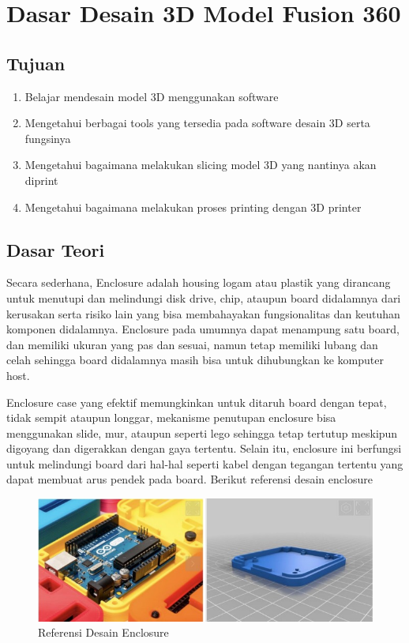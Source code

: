 \chapter{Dasar Desain 3D Model Fusion 360}

\section{Tujuan}
\begin{enumerate}
    \item Belajar mendesain model 3D menggunakan software
    \item Mengetahui berbagai tools yang tersedia pada software desain 3D serta fungsinya
    \item Mengetahui bagaimana melakukan slicing model 3D yang nantinya akan diprint
    \item Mengetahui bagaimana melakukan proses printing dengan 3D printer
\end{enumerate}

\section{Dasar Teori}
Secara sederhana, Enclosure adalah housing logam atau plastik yang dirancang untuk menutupi dan
melindungi disk drive, chip, ataupun board didalamnya dari kerusakan serta risiko lain yang bisa
membahayakan fungsionalitas dan keutuhan komponen didalamnya. Enclosure pada umumnya dapat
menampung satu board, dan memiliki ukuran yang pas dan sesuai, namun tetap memiliki lubang dan celah
sehingga board didalamnya masih bisa untuk dihubungkan ke komputer host.

Enclosure case yang efektif memungkinkan untuk ditaruh board dengan tepat, tidak sempit ataupun
longgar, mekanisme penutupan enclosure bisa menggunakan slide, mur, ataupun seperti lego sehingga
tetap tertutup meskipun digoyang dan digerakkan dengan gaya tertentu. Selain itu, enclosure ini
berfungsi untuk melindungi board dari hal-hal seperti kabel dengan tegangan tertentu yang dapat
membuat arus pendek pada board. Berikut referensi desain enclosure
\begin{figure}[H]
    \centering
    \includegraphics[width=1\linewidth]{P3/img/image1.jpg}
    \caption{Referensi Desain Enclosure}
    \label{fig:Referensi Desain Enclosure}
\end{figure}

